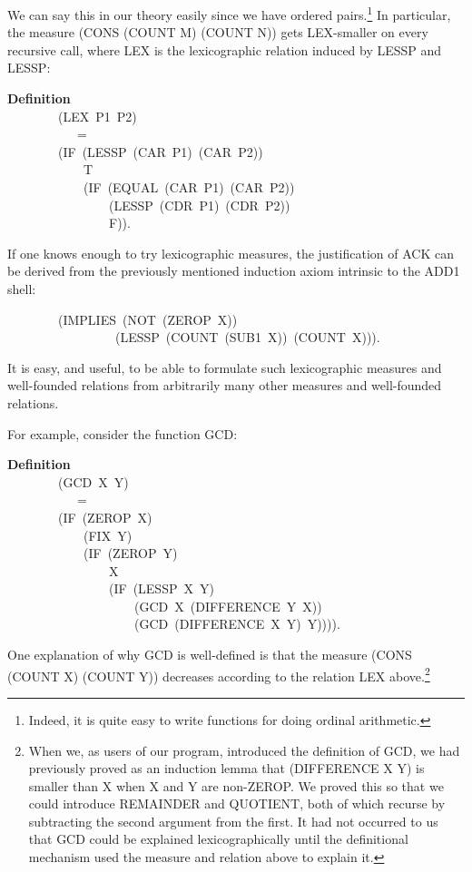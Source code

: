 \documentclass[10pt]{book}
\newenvironment{pubasis}{\begin{flushleft}}{\end{flushleft}}
\newcommand{\axiomordefinition}[1]{\vspace{6pt}\Large\textsf{\textbf{#1}}\normalsize}
\begin{document}
We can say this in our theory  easily since we have ordered pairs.\footnote{Indeed, it is quite easy to write  functions for doing ordinal arithmetic.}  In particular,
the measure (CONS (COUNT M) (COUNT N)) gets LEX-smaller on every recursive call, where
LEX is the lexicographic relation induced by LESSP and LESSP:
\begin{pubasis}
\axiomordefinition{Definition}\\
~~~~~~~~(LEX~P1~P2)\\
~~~~~~~~~~~=\\
~~~~~~~~(IF~(LESSP~(CAR~P1)~(CAR~P2))\\
~~~~~~~~~~~~T\\
~~~~~~~~~~~~(IF~(EQUAL~(CAR~P1)~(CAR~P2))\\
~~~~~~~~~~~~~~~~(LESSP~(CDR~P1)~(CDR~P2))\\
~~~~~~~~~~~~~~~~F)).\\
\end{pubasis}
If one knows enough to try lexicographic measures,
the justification of ACK can be derived from the previously
mentioned induction axiom intrinsic to the ADD1 shell:
\begin{pubasis}
~~~~~~~~(IMPLIES~(NOT~(ZEROP~X))\\
~~~~~~~~~~~~~~~~~(LESSP~(COUNT~(SUB1~X))~(COUNT~X))).\\
\end{pubasis}
It is easy, and useful, to be able to formulate such lexicographic
measures and well-founded relations from arbitrarily many other measures
and well-founded relations.

For example, consider the function GCD:

\begin{pubasis}
\axiomordefinition{Definition}\\
~~~~~~~~(GCD~X~Y)\\
~~~~~~~~~~~=\\
~~~~~~~~(IF~(ZEROP~X)\\
~~~~~~~~~~~~(FIX~Y)\\
~~~~~~~~~~~~(IF~(ZEROP~Y)\\
~~~~~~~~~~~~~~~~X\\
~~~~~~~~~~~~~~~~(IF~(LESSP~X~Y)\\
~~~~~~~~~~~~~~~~~~~~(GCD~X~(DIFFERENCE~Y~X))\\
~~~~~~~~~~~~~~~~~~~~(GCD~(DIFFERENCE~X~Y)~Y)))).\\
\end{pubasis}
One explanation of why GCD is well-defined
is that the measure (CONS (COUNT X) (COUNT Y)) decreases according
to the relation LEX above.\footnote{When we, as users of our program, introduced the definition of GCD, we had previously proved as an induction lemma that (DIFFERENCE X Y) is smaller than X when X and Y are non-ZEROP. We proved this so that we could introduce REMAINDER and QUOTIENT, both of which recurse by subtracting the second argument from the first. It had not occurred to us that GCD could be explained lexicographically until the definitional mechanism used the measure and relation above to explain it.}
\end{document}
